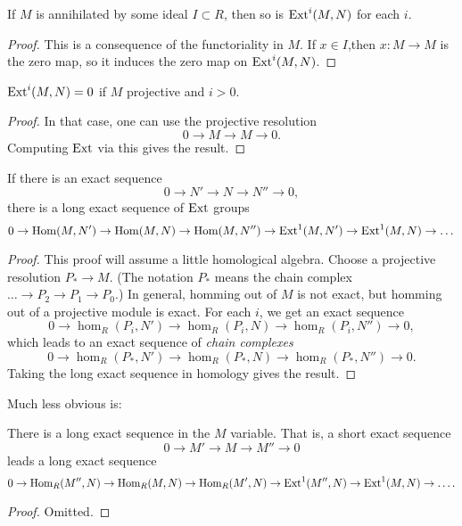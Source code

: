 \begin{proposition}
If $M$ is annihilated by some ideal $I \subset R$, then so is
$\operatorname{Ext}^i(M,N)$ for
each $i$.
\end{proposition}
\begin{proof}
This is a consequence of the functoriality in $M$. If $x \in
I$,then $x: M \to
M$ is the zero map, so it induces the zero map on
$\operatorname{Ext}^i(M,N)$.\end{proof}

\begin{proposition}
$\operatorname{Ext}^i(M,N) = 0$ if $M$ projective and $i>0$.
\end{proposition}
\begin{proof}
In that case, one can use the projective resolution
\[ 0 \to M \to M \to 0.  \]
Computing $\operatorname{Ext}$ via this gives the result.
\end{proof}




\begin{proposition}
If there is an exact sequence
\[ 0 \to N' \to N \to N'' \to 0,  \]
there is a long exact sequence of $\operatorname{Ext}$ groups
\[ 0 \to \operatorname{Hom}(M,N') \to \operatorname{Hom}(M,N) \to \operatorname{Hom}(M,N'') \to
\operatorname{Ext}^1(M,N') \to
\operatorname{Ext}^1(M,N) \to \dots  \]
\end{proposition}
\begin{proof}
This proof will assume a little homological algebra. Choose a
projective
resolution $P_* \to M$. (The notation $P_*$ means the chain
complex $\dots \to
P_2 \to P_1 \to P_0$.) In general, homming out of $M$ is not
exact, but homming
out of a projective module is exact. For each $i$, we get an
exact sequence
\[ 0 \to \hom_R(P_i, N') \to \hom_R(P_i, N) \to \hom_R(P_i,
N'')\to 0, \]
which leads to an exact sequence of \emph{chain complexes}
\[ 0 \to \hom_R(P_*,N') \to \hom_R(P_*,N) \to \hom_R(P_*,N'')
\to 0 . \]
Taking the long exact sequence in homology gives the result.
\end{proof}


Much less obvious is:

\begin{proposition}
There is a long exact sequence in the $M$ variable. That is, a
short exact
sequence
\[ 0 \to M' \to M \to M'' \to 0  \]
leads a long exact sequence
\[ 0 \to \operatorname{Hom}_R(M'', N) \to \operatorname{Hom}_R(M,N) \to \operatorname{Hom}_R(M', N) \to
\operatorname{Ext}^1(M'', N)
\to \operatorname{Ext}^1(M, N) \to \dots.  \]
\end{proposition}
\begin{proof}
Omitted.
\end{proof}

